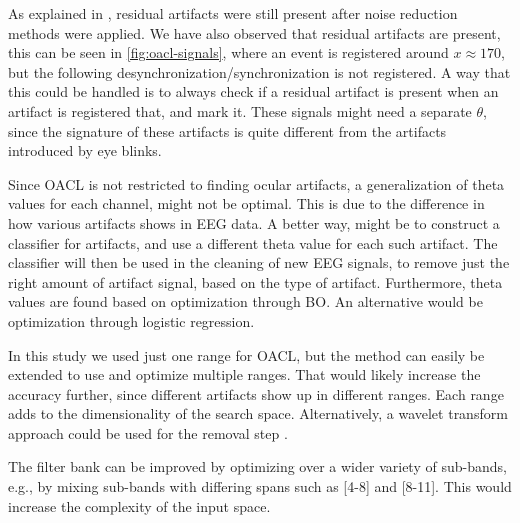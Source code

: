 As explained in \cite{hoffmann2008correction}, residual artifacts were still present after noise reduction methods were applied. We have also observed that residual artifacts are present, this can be seen in \cref{fig:oacl-signals}, where an event is registered around $x \approx 170$, but the following desynchronization/synchronization is not registered. A way that this could be handled is to always check if a residual artifact is present when an artifact is registered that, and mark it. These signals might need a separate $\theta$, since the signature of these artifacts is quite different from the artifacts introduced by eye blinks.

Since OACL is not restricted to finding ocular artifacts, a generalization of theta values for each channel, might not be optimal. This is due to the difference in how various artifacts shows in EEG data. A better way, might be to construct a classifier for artifacts, and use a different theta value for each such artifact. The classifier will then be used in the cleaning of new EEG signals, to remove just the right amount of artifact signal, based on the type of artifact. Furthermore, theta values are found based on optimization through BO. An alternative would be optimization through logistic regression. 

In this study we used just one range for OACL, but the method can easily be extended to use and optimize multiple ranges. That would likely increase the accuracy further, since different artifacts show up in different ranges. Each range adds to the dimensionality of the search space. Alternatively, a wavelet transform approach could be used for the removal step \citep{krishnaveni2006automatic}.

The filter bank can be improved by optimizing over a wider variety of sub-bands, e.g., by mixing sub-bands with differing spans such as [4-8] and [8-11]. This would increase the complexity of the input space.
